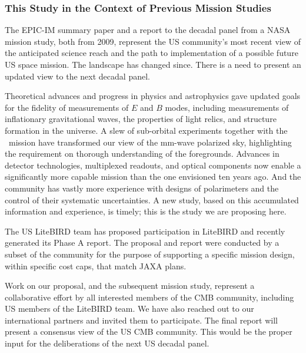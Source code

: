 \vspace{-0.18in}

\subsubsection{This Study in the Context of Previous Mission Studies} 

\vspace{-0.05in}

The EPIC-IM summary paper and a report to the decadal panel from a NASA mission study, both from 2009, represent 
the US community's most recent view of the anticipated 
science reach and the path to implementation of a possible future US space mission. The landscape 
has changed since.  There is a need to present an updated view to the next decadal panel.  

Theoretical advances and progress in physics and astrophysics gave updated 
goals for the fidelity of measurements of $E$ and $B$ modes, including measurements of inflationary 
gravitational waves, the properties of light relics, and structure formation in the universe. A 
slew of sub-orbital experiments together with the \planck\ mission have 
transformed our view of the mm-wave polarized sky, highlighting the requirement on 
thorough understanding of the foregrounds. Advances in detector technologies, multiplexed readouts,
and optical components now enable a significantly more capable mission than the one envisioned
ten years ago. And the community has vastly more experience with designs of polarimeters and 
the control of their systematic uncertainties.  A new study, based on this accumulated information and 
experience, is timely; this is the study we are proposing here. 

The US LiteBIRD team has proposed participation in LiteBIRD and recently generated its Phase A 
report. The proposal and report were conducted by 
a subset of the community for the purpose of supporting a specific mission design, within specific 
cost caps, that match JAXA plans. 

Work on our proposal, and 
the subsequent mission study, represent a collaborative effort by all interested members of the 
CMB community, including US members of the LiteBIRD team. We have also reached out to our international partners 
and invited them to participate. The final report will present a consensus view of the US CMB community. 
This would be the proper input for the deliberations of the next US decadal panel. 



























